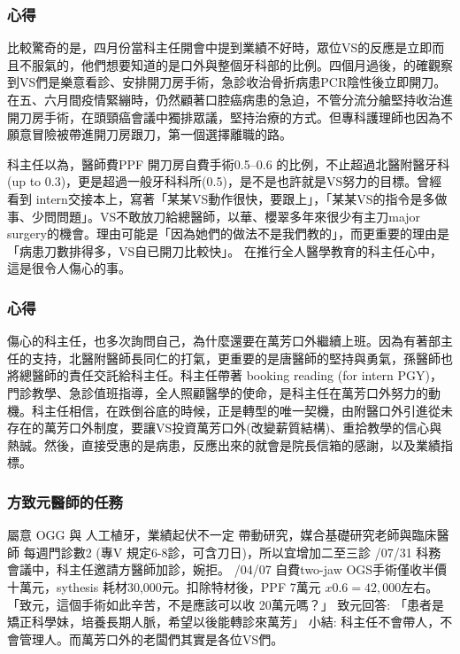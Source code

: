 \documentclass[t,24pt,aspectratio=169]{beamer}
\begin{document}
\begin{frame}[hoved]
\frametitle{心得}
比較驚奇的是，四月份當科主任開會中提到業績不好時，眾位VS的反應是立即而且不服氣的，他們想要知道的是口外與整個牙科部的比例。四個月過後，的確觀察到VS們是樂意看診、安排開刀房手術，急診收治骨折病患PCR陰性後立即開刀。在五、六月間疫情緊繃時，仍然顧著口腔癌病患的急迫，不管分流分艙堅持收治進開刀房手術，在頭頸癌會議中獨排眾議，堅持治療的方式。但專科護理師也因為不願意冒險被帶進開刀房跟刀，第一個選擇離職的路。


科主任以為，醫師費PPF 開刀房自費手術0.5--0.6 的比例，不止超過北醫附醫牙科(up to 0.3)，更是超過一般牙科科所(0.5)，是不是也許就是VS努力的目標。曾經看到 intern交接本上，寫著「某某VS動作很快，要跟上」，「某某VS的指令是多做事、少問問題」。VS不敢放刀給總醫師，以華、櫻翠多年來很少有主刀major surgery的機會。理由可能是「因為她們的做法不是我們教的」，而更重要的理由是「病患刀數排得多，VS自已開刀比較快」。
在推行全人醫學教育的科主任心中，這是很令人傷心的事。
\end{frame}



\begin{frame}[hoved]
\frametitle{心得}
傷心的科主任，也多次詢問自己，為什麼還要在萬芳口外繼續上班。因為有著部主任的支持，北醫附醫師長同仁的打氣，更重要的是唐醫師的堅持與勇氣，孫醫師也將總醫師的責任交託給科主任。科主任帶著 booking reading (for intern PGY)，門診教學、急診值班指導，全人照顧醫學的使命，是科主任在萬芳口外努力的動機。科主任相信，在跌倒谷底的時候，正是轉型的唯一契機，由附醫口外引進從未存在的萬芳口外制度，要讓VS投資萬芳口外(改變薪質結構)、重拾教學的信心與熱誠。然後，直接受惠的是病患，反應出來的就會是院長信箱的感謝，以及業績指標。
\end{frame}



\begin{frame}[hoved]
\frametitle{方致元醫師的任務}
\begin{outline}
\1 屬意 OGG 與 人工植牙，業績起伏不一定
\1 帶動研究，媒合基礎研究老師與臨床醫師
\1 每週門診數2 (專V 規定6-8診，可含刀日)，所以宜增加二至三診
    /07/31 科務會議中，科主任邀請方醫師加診，婉拒。
/04/07 自費two-jaw OGS手術僅收半價十萬元，sythesis 耗材30,000元。扣除特材後，PPF 7萬元 $x 0.6 = 42,000$左右。
    \2 「致元，這個手術如此辛苦，不是應該可以收 20萬元嗎？」
    \2 致元回答: 「患者是矯正科學妹，培養長期人脈，希望以後能轉診來萬芳」
\1 小結: 科主任不會帶人，不會管理人。而萬芳口外的老闆們其實是各位VS們。
\end{outline}


\end{frame}
\end{document}
